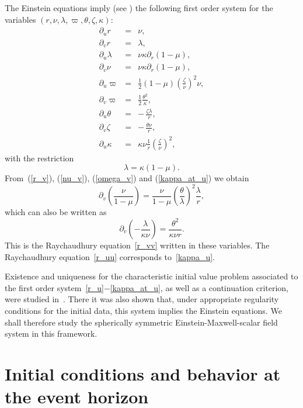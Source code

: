 \documentclass[a4paper,11pt,oneside,reqno]{amsart}
\begin{document}
The Einstein equations imply (see \cite{relIst1}) the following first order system for the variables $(r,\nu,\lambda,\varpi,\theta,\zeta,\kappa)$:
\begin{eqnarray} 
 \partial_ur&=&\nu\label{r_u},\\
 \partial_vr&=&\lambda\label{r_v},\\
 \partial_u\lambda&=&\nu\kappa\partial_r(1-\mu)\label{lambda_u},\\
 \partial_v\nu&=&\nu\kappa\partial_r(1-\mu),\label{nu_v}\\
 \partial_u\varpi&=&\frac 12(1-\mu)\left(\frac\zeta\nu\right)^2\nu,\label{omega_u}\\
 \partial_v\varpi&=&\frac 12\frac{\theta^2}{\kappa},\label{omega_v}\\
 \partial_u\theta&=&-\,\frac{\zeta\lambda}{r},\label{theta_u}\\
 \partial_v\zeta&=&-\,\frac{\theta\nu}{r},\label{zeta_v}\\
 \partial_u\kappa&=&\kappa\nu\frac 1r\left(\frac{\zeta}{\nu}\right)^2,\label{kappa_u}
\end{eqnarray}
with the restriction
\begin{equation}\label{kappa_at_u} 
\lambda=\kappa(1-\mu).
\end{equation}
From~(\ref{r_v}), (\ref{nu_v}), (\ref{omega_v}) and (\ref{kappa_at_u}) we obtain
\begin{equation}\label{ray_v_bis} 
\partial_v\left(\frac{\nu}{1-\mu}\right)=\frac{\nu}{1-\mu}\left(\frac{\theta}{\lambda}\right)^2\frac{\lambda}{r},
\end{equation}
which can also be written as
\begin{equation}\label{ray_v_dois} 
\partial_v\left(-\frac{\lambda}{\kappa\nu}\right)=\frac{\theta^2}{\kappa\nu r}.
\end{equation}
This is the Raychaudhury equation~\eqref{r_vv} written in these variables. The Raychaudhury equation~\eqref{r_uu} corresponds to~\eqref{kappa_u}.

Existence and uniqueness for the characteristic initial value problem associated to the first order system~\eqref{r_u}$-$\eqref{kappa_at_u}, as well as a continuation criterion, were studied in~\cite{relIst1}. There it was also shown that, under appropriate regularity conditions for the initial data, this system implies the Einstein equations. We shall therefore study the spherically symmetric Einstein-Maxwell-scalar field system in this framework.

\section{Initial conditions and behavior at the event horizon}\label{section3}
\end{document}
